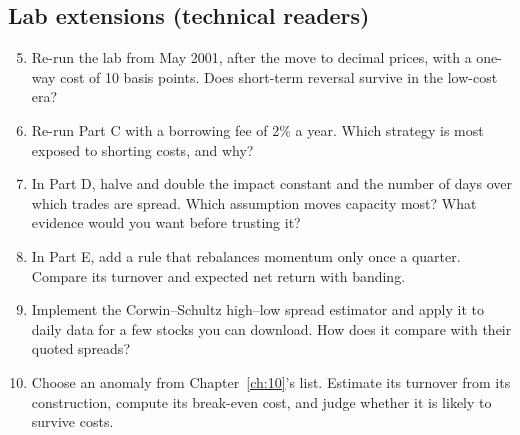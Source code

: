 \subsection*{Lab extensions (technical readers)}

\begin{enumerate}
  \setcounter{enumi}{4}
  \item Re-run the lab from May 2001, after the move to decimal prices, with a one-way cost of 10 basis points. Does short-term reversal survive in the low-cost era?
  \item Re-run Part C with a borrowing fee of 2\% a year. Which strategy is most exposed to shorting costs, and why?
  \item In Part D, halve and double the impact constant and the number of days over which trades are spread. Which assumption moves capacity most? What evidence would you want before trusting it?
  \item In Part E, add a rule that rebalances momentum only once a quarter. Compare its turnover and expected net return with banding.
  \item Implement the Corwin--Schultz high--low spread estimator and apply it to daily data for a few stocks you can download. How does it compare with their quoted spreads?
  \item Choose an anomaly from Chapter~\ref{ch:10}'s list. Estimate its turnover from its construction, compute its break-even cost, and judge whether it is likely to survive costs.
\end{enumerate}
